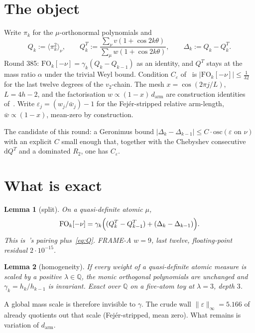 \documentclass[11pt]{article}
\newtheorem{lemma}{Lemma}
\theoremstyle{remark}
\newcommand{\Q}{\mathbb{Q}}
\begin{document}
\section{The object}\label{sec:obj}

Write $\pi_k$ for the $\mu$-orthonormal polynomials and
\begin{equation}\label{eq:Q}
Q_k:=\langle\pi_k^2\rangle_\nu,\qquad
Q_k^T:=\frac{\sum_\nu v(1+\cos 2k\theta)}{\sum_\mu w(1+\cos 2k\theta)},
\qquad
\Delta_k:=Q_k-Q_k^T.
\end{equation}
Round 385: $\mathrm{FO}_k[-\nu]=\gamma_k(Q_k-Q_{k-1})$ as an identity,
and $Q^T$ stays at the mass ratio $\alpha$ under the trivial Weyl bound.
Condition $C_\varepsilon$ of~\cite{r381} is
$\lvert\mathrm{FO}_k[-\nu]\rvert\le\tfrac1{32}$ for the last twelve
degrees of the $v_2$-chain.
The mesh $x=\cos(2\pi j/L)$, $L=4h-2$, and the factorisation
$w\propto(1-x)\,d_{\mathrm{arm}}$ are construction identities
of~\cite{v3p}.
Write $\varepsilon_j=(w_j/\bar w_j)-1$ for the Fej\'er-stripped
relative arm-length, $\bar w\propto(1-x)$, mean-zero by construction.

The candidate of this round: a Geronimus bound
$\lvert\Delta_k-\Delta_{k-1}\rvert\le C\cdot\mathrm{osc}(\varepsilon\text{ on }\nu)$
with an explicit $C$ small enough that, together with the Chebyshev
consecutive $\mathrm{d}Q^T$ and a dominated $R_2$, one has $C_\varepsilon$.

\section{What is exact}\label{sec:exact}

\begin{lemma}[split]\label{lem:split}
On a quasi-definite atomic $\mu$,
\[
\mathrm{FO}_k[-\nu]
=
\gamma_k\Bigl(
(Q_k^T-Q_{k-1}^T)+(\Delta_k-\Delta_{k-1})
\Bigr).
\]
This is~\cite{r385}'s pairing plus~\eqref{eq:Q}.
FRAME-A $w=9$, last twelve, floating-point residual $2\cdot10^{-15}$.
\end{lemma}

\begin{lemma}[homogeneity]\label{lem:hom}
If every weight of a quasi-definite atomic measure is scaled by a
positive $\lambda\in\Q$, the monic orthogonal polynomials are unchanged
and $\gamma_k=h_k/h_{k-1}$ is invariant.
Exact over $\Q$ on a five-atom toy at $\lambda=3$, depth $3$.
\end{lemma}

A global mass scale is therefore invisible to $\gamma$.
The crude wall $\lVert\varepsilon\rVert_\infty=5.166$ of~\cite{r381}
already quotients out that scale (Fej\'er-stripped, mean zero).
What remains is variation of $d_{\mathrm{arm}}$.
\end{document}
